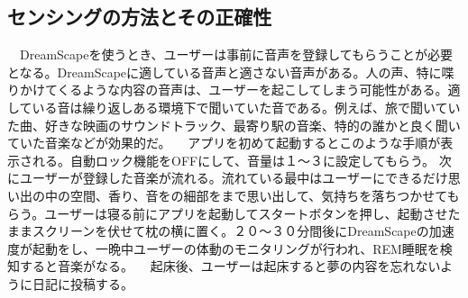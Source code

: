 \subsection{センシングの方法とその正確性}
　DreamScapeを使うとき、ユーザーは事前に音声を登録してもらうことが必要となる。DreamScapeに適している音声と適さない音声がある。人の声、特に喋りかけてくるような内容の音声は、ユーザーを起こしてしまう可能性がある。適している音は繰り返しある環境下で聞いていた音である。例えば、旅で聞いていた曲、好きな映画のサウンドトラック、最寄り駅の音楽、特的の誰かと良く聞いていた音楽などが効果的だ。
　アプリを初めて起動するとこのような手順が表示される。自動ロック機能をOFFにして、音量は１〜３に設定してもらう。 次にユーザーが登録した音楽が流れる。流れている最中はユーザーにできるだけ思い出の中の空間、香り、音をの細部をまで思い出して、気持ちを落ちつかせてもらう。ユーザーは寝る前にアプリを起動してスタートボタンを押し、起動させたままスクリーンを伏せて枕の横に置く。２０〜３０分間後にDreamScapeの加速度が起動をし、一晩中ユーザーの体動のモニタリングが行われ、REM睡眠を検知すると音楽がなる。
　起床後、ユーザーは起床すると夢の内容を忘れないように日記に投稿する。